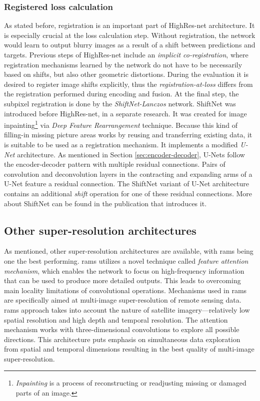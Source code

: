 \subsubsection{Registered loss calculation}
\label{sec:shiftnet}
As stated before, registration is an important part of HighRes-net architecture.
It is especially crucial at the loss calculation step.
Without registration, the network would learn to output blurry images as a result of a shift between predictions and targets.
Previous steps of HighRes-net include an \textit{implicit co-registration}, where registration mechanisms learned by the network do not have to be necessarily based on shifts, but also other geometric distortions.
During the evaluation it is desired to register image shifts explicitly, thus the \textit{registration-at-loss} differs from the registration performed during encoding and fusion.
At the final step, the subpixel registration is done by the \textit{ShiftNet-Lanczos} network.
ShiftNet \cite{zhaoyi-2018-shiftnet} was introduced before HighRes-net, in a separate research.
It was created for image inpainting\footnote{\textit{Inpainting} is a process of reconstructing or readjusting missing or damaged parts of an image.} via \textit{Deep Feature Rearrangement} technique.
Because this kind of filling-in missing picture areas works by reusing and transferring existing data, it is suitable to be used as a registration mechanism.
It implements a modified \textit{U-Net} \cite{ronnenberger-2015-unet} architecture.
As mentioned in Section \ref{sec:encoder-decoder}, U-Nets follow the encoder-decoder pattern with multiple residual connections.
Pairs of convolution and deconvolution layers in the contracting and expanding arms of a U-Net feature a residual connection.
The ShiftNet variant of U-Net architecture contains an additional \textit{shift} operation for one of these residual connections.
More about ShiftNet can be found in the publication that introduces it.

\subsection{Other super-resolution architectures}
As mentioned, other super-resolution architectures are available, with \gls{rams} \cite{salvetti-2020-rams} being one the best performing.
\gls{rams} utilizes a novel technique called \textit{feature attention mechanism}, which enables the network to focus on high-frequency information that can be used to produce more detailed outputs.
This leads to overcoming main locality limitations of convolutional operations.
Mechanisms used in \gls{rams} are specifically aimed at multi-image super-resolution of remote sensing data.
\gls{rams} approach takes into account the nature of satellite imagery---relatively low spatial resolution and high depth and temporal resolution.
The attention mechanism works with three-dimensional convolutions to explore all possible directions.
This architecture puts emphasis on simultaneous data exploration from spatial and temporal dimensions resulting in the best quality of multi-image super-resolution.

